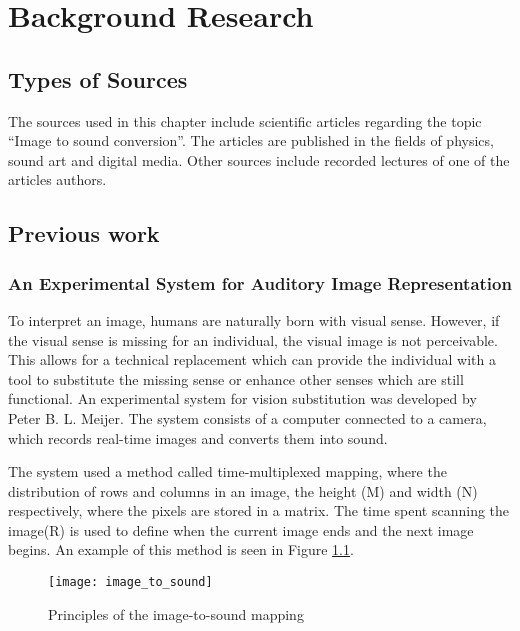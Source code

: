 \chapter{Background Research}\label{ch:bgresearch}

\section{Types of Sources}\label{sec:typesofsources} 
The sources used in this chapter include scientific articles regarding the topic “Image to sound conversion”. The articles are published in the fields of physics, sound art and digital media. Other sources include recorded lectures of one of the articles authors.

\section{Previous work}\label{sec:previouswork}

\subsection{An Experimental System for Auditory Image Representation}\label{sec:experimentalsystem}

To interpret an image, humans are naturally born with visual sense. However, if the visual sense is missing for an individual, the visual image is not perceivable. This allows for a technical replacement which can provide the individual with a tool to substitute the missing sense or enhance other senses which are still functional. An experimental system for vision substitution was developed by Peter B. L. Meijer\cite{Meijer1992}. The system consists of a computer connected to a camera, which records real-time images and converts them into sound. 

The system used a method called time-multiplexed mapping, where the distribution of rows and columns in an image, the height (M) and width (N) respectively, where the pixels are stored in a matrix. The time spent scanning the image(R) is used to define when the current image ends and the next image begins. An example of this method is seen in Figure \ref{fig:image_to_sound}. 

\begin{figure}[!h] 
\centering
\texttt{[image: image\_to\_sound]}
\caption{\label{fig:image_to_sound} Principles of the image-to-sound mapping \cite{Meijer1992}}
\end{figure}
  
